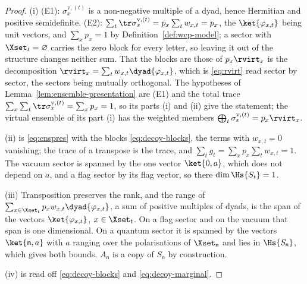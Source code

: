 \begin{proof}
(i) (E1): $\sigma^{\mathrm v,(t)}_x$ is a non-negative multiple of a dyad, hence
Hermitian and positive semidefinite. (E2):
$\sum_t\tr\sigma^{\mathrm v,(t)}_x=p_x\sum_tw_{x,t}=p_x$, the
$\ket{\varphi_{x,t}}$ being unit vectors, and $\sum_xp_x=1$ by
Definition~\ref{def:wcp-model}; a sector with $\Xset_t=\varnothing$ carries the
zero block for every letter, so leaving it out of the structure changes neither
sum. That the blocks are those of $p_x\rvirt_x$ is the decomposition
$\rvirt_x=\sum_tw_{x,t}\dyad{\varphi_{x,t}}$, which is \eqref{eq:rvirt} read
sector by sector, the sectors being mutually orthogonal. The hypotheses of
Lemma~\ref{lem:ensemble-presentation} are (E1) and the total trace
$\sum_x\sum_t\tr\sigma^{\mathrm v,(t)}_x=\sum_xp_x=1$, so its parts (i) and
(ii) give the statement; the virtual ensemble of its part (i) has the weighted
members $\bigoplus_t\sigma^{\mathrm v,(t)}_x=p_x\rvirt_x$.

(ii) is \eqref{eq:enspres} with the blocks \eqref{eq:decoy-blocks}, the terms
with $w_{x,t}=0$ vanishing; the trace of a transpose is the trace, and
$\sum_tg_t=\sum_xp_x\sum_tw_{x,t}=1$. The vacuum sector is spanned by the one
vector $\ket{0,a}$, which does not depend on $a$, and a flag sector by its flag
vector, so there $\dim\Hs{S_t}=1$.

(iii) Transposition preserves the rank, and the range of
$\sum_{x\in\Xset_t}p_xw_{x,t}\dyad{\varphi_{x,t}}$, a sum of positive multiples
of dyads, is the span of the vectors $\ket{\varphi_{x,t}}$, $x\in\Xset_t$. On a
flag sector and on the vacuum that span is one dimensional. On a quantum sector
it is spanned by the vectors $\ket{\mathsf{n},a}$ with $a$ ranging over the
polarisations of $\Xset_{\mathsf{n}}$ and lies in $\Hs{S_{\mathsf{n}}}$, which
gives both bounds. $A_{\mathsf{n}}$ is a copy of $S_{\mathsf{n}}$ by
construction.

(iv) is read off \eqref{eq:decoy-blocks} and \eqref{eq:decoy-marginal}.
\end{proof}
